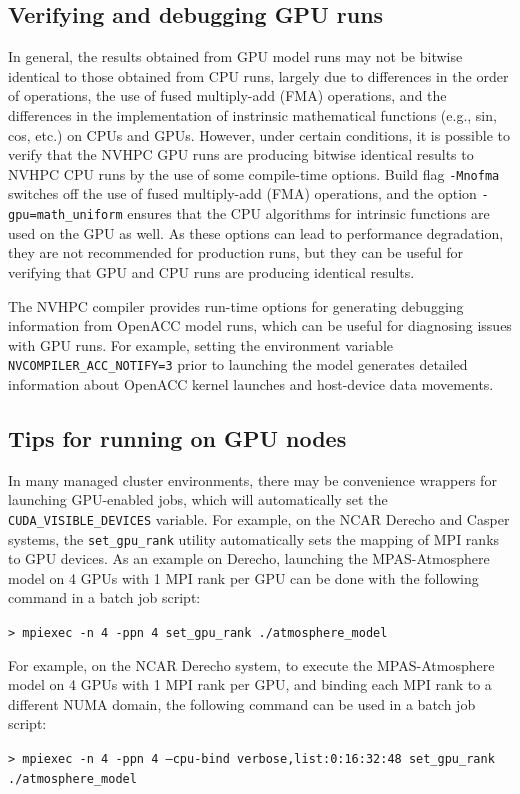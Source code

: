 \subsection{Verifying and debugging GPU runs}
In general, the results obtained from GPU model runs may not be bitwise identical to those obtained from CPU runs, largely due to differences in the 
order of operations, the use of fused multiply-add (FMA) operations, and the differences in the implementation of instrinsic mathematical functions (e.g., sin, cos, etc.) on CPUs and GPUs.
However, under certain conditions, it is possible to verify that the NVHPC GPU runs are producing bitwise identical results to NVHPC CPU runs by the use of some compile-time options. Build flag {\tt -Mnofma}
switches off the use of fused multiply-add (FMA) operations, and the option {\tt -gpu=math\_uniform} ensures that the CPU algorithms for intrinsic functions are used on the GPU as well. As these
options can lead to performance degradation, they are not recommended for production runs, but they can be useful for verifying that GPU and CPU runs are producing identical results.

\vspace{12pt}

The NVHPC compiler provides run-time options for generating debugging information from OpenACC model runs,
which can be useful for diagnosing issues with GPU runs. For example, setting the environment variable {\tt NVCOMPILER\_ACC\_NOTIFY=3} prior to 
launching the model generates detailed information about OpenACC kernel launches and host-device data movements.

\subsection{Tips for running on GPU nodes}

In many managed cluster environments, there may be convenience wrappers for launching GPU-enabled jobs, which will automatically set the {\tt CUDA\_VISIBLE\_DEVICES} variable.
For example, on the NCAR Derecho and Casper systems, the {\tt set\_gpu\_rank} utility automatically sets the mapping of MPI ranks to GPU devices. As an example on Derecho,
launching the MPAS-Atmosphere model on 4 GPUs with 1 MPI rank per GPU can be done with the following command in a batch job script:

\vspace{12pt}
{\tt > mpiexec -n 4 -ppn 4 set\_gpu\_rank ./atmosphere\_model}
\vspace{12pt}


For example, on the NCAR Derecho system, to execute the MPAS-Atmosphere model on 4 GPUs with 1 MPI rank per GPU, and binding each MPI rank to a different NUMA domain,
the following command can be used in a batch job script:

\vspace{12pt}
{\tt > mpiexec -n 4 -ppn 4 --cpu-bind verbose,list:0:16:32:48 set\_gpu\_rank ./atmosphere\_model}
\vspace{12pt}



